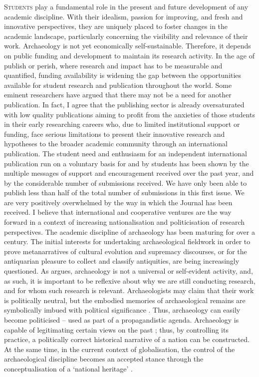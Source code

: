 \lettrine[nindent=0em,lines=3]{S}{tudents} play a fundamental role in the present and future development of any academic discipline. With their idealism, passion for improving, and fresh and innovative perspectives, they are uniquely placed to foster changes in the academic landscape, particularly concerning the visibility and relevance of their work. Archaeology is not yet economically self-sustainable. Therefore, it depends on public funding and development to maintain its research activity. In the age of publish or perish, where research and impact has to be measurable and quantified, funding availability is widening the gap between the opportunities available for student research and publication throughout the world. Some eminent researchers have argued that there may not be a need for another publication. In fact, I agree that the publishing sector is already oversaturated with low quality publications aiming to profit from the anxieties of those students in their early researching careers who, due to limited institutional support or funding, face serious limitations to present their innovative research and hypotheses to the broader academic community through an international publication. 
The student need and enthusiasm for an independent international publication run on a voluntary basis for and by students has been shown by the multiple messages of support and encouragement received over the past year, and by the considerable number of submissions received. We have only been able to publish less than half of the total number of submissions in this first issue. We are very positively overwhelmed by the way in which the Journal has been received. I believe that international and cooperative ventures are the way forward in a context of increasing nationalisation and politicisation of research perspectives.
		The academic discipline of archaeology has been maturing for over a century. The initial interests for undertaking archaeological fieldwork in order to prove metanarratives of cultural evolution and supremacy discourses, or for the antiquarian pleasure to collect and classify antiquities, are being increasingly questioned. 
        As \textcite{Trigger_2006} argues, archaeology is not a universal or self-evident activity, and, as such, it is important to be reflexive about why we are still conducting research, and for whom such research is relevant. Archaeologists may claim that their work is politically neutral, but the embodied memories of archaeological remains are symbolically imbued with political significance \parencite{Meskell_2012a}. 
        Thus, archaeology can easily become politicised -- used as part of a propagandistic agenda. Archaeology is capable of legitimating certain views on the past \parencite{Alexandri_2002}; thus, by controlling its practice, a politically correct historical narrative of a nation can be constructed. At the same time, in the current context of globalisation, the control of the archaeological discipline becomes an accepted stance through the conceptualisation of a ‘national heritage’ \parencite{Özdogan_1998}. 
